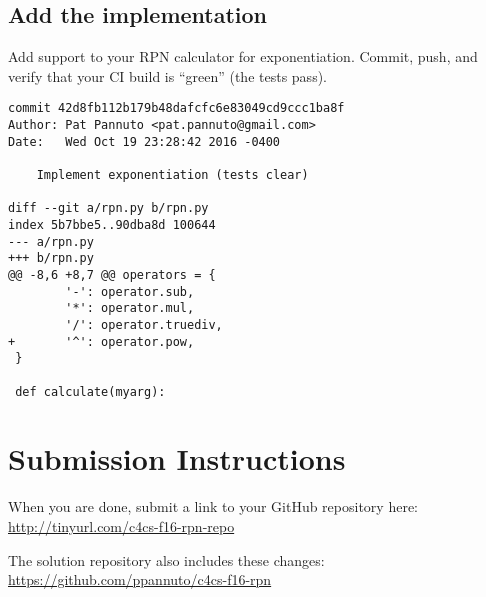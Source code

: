 \documentclass{article}
\begin{document}
\subsection{Add the implementation}
Add support to your RPN calculator for exponentiation. Commit, push,
and verify that your CI build is ``green'' (the tests pass).

{\color{violet}
\begin{lstlisting}
commit 42d8fb112b179b48dafcfc6e83049cd9ccc1ba8f
Author: Pat Pannuto <pat.pannuto@gmail.com>
Date:   Wed Oct 19 23:28:42 2016 -0400

    Implement exponentiation (tests clear)

diff --git a/rpn.py b/rpn.py
index 5b7bbe5..90dba8d 100644
--- a/rpn.py
+++ b/rpn.py
@@ -8,6 +8,7 @@ operators = {
        '-': operator.sub,
        '*': operator.mul,
        '/': operator.truediv,
+       '^': operator.pow,
 }

 def calculate(myarg):
\end{lstlisting}
}

\section*{Submission Instructions}
When you are done, submit a link to your GitHub repository here: \url{http://tinyurl.com/c4cs-f16-rpn-repo}

{\color{violet}
  The solution repository also includes these changes:
  \url{https://github.com/ppannuto/c4cs-f16-rpn}
}
\end{document}
